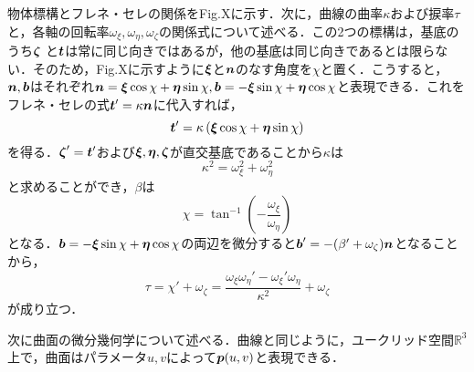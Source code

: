  	物体標構とフレネ・セレの関係をFig.Xに示す．次に，曲線の曲率$ \kappa $および捩率$ \tau $と，各軸の回転率$ \omega_{\xi},\omega_{\eta},\omega_{\zeta} $の関係式について述べる．この2つの標構は，基底のうち$ \boldsymbol{\zeta}$ と$\boldsymbol{t} $は常に同じ向きではあるが，他の基底は同じ向きであるとは限らない．そのため，Fig.Xに示すように$ \boldsymbol{\xi} $と$ \boldsymbol{n} $のなす角度を$ \chi $と置く．こうすると，$ \boldsymbol{n},\boldsymbol{b}$はそれぞれ$ \boldsymbol{n} = \boldsymbol{\xi} \cos \chi + \boldsymbol{\eta} \sin \chi,\boldsymbol{b} = -\boldsymbol{\xi} \sin \chi + \boldsymbol{\eta} \cos \chi $と表現できる．これをフレネ・セレの式$ \boldsymbol{t}' = \kappa \boldsymbol{n} $に代入すれば，
 	\begin{equation}\label{eq:t_dot_eq}
 		\boldsymbol{t}' = \kappa \left( \boldsymbol{\xi} \cos \chi + \boldsymbol{\eta} \sin \chi \right)
 	\end{equation}
 	を得る．$ \boldsymbol{\zeta}' = \boldsymbol{t}' $および$ \boldsymbol{\xi},\boldsymbol{\eta},\boldsymbol{\zeta} $が直交基底であることから$ \kappa $は
 	\begin{equation}\label{eq:kappa_and_omega}
 		\kappa^2 = \omega_{\xi}^2 + \omega_{\eta}^2
 	\end{equation}
 	と求めることができ，$ \beta $は
 	\begin{equation}\label{eq:beta_and_omega}
 		\chi = \tan^{-1} \left( -\frac{\omega_{\xi}}{\omega_{\eta}} \right)
 	\end{equation}
 	となる．$ \boldsymbol{b} = -\boldsymbol{\xi} \sin \chi + \boldsymbol{\eta} \cos \chi$の両辺を微分すると$ \boldsymbol{b}' = -(\beta' + \omega_{\zeta})\boldsymbol{n} $となることから，
 	\begin{equation}\label{eq:tau_and_omega}
 		\tau = \chi' + \omega_{\zeta} = \frac{\omega_{\xi} \omega_{\eta}' - \omega_{\xi}' \omega_{\eta}}{\kappa^2} + \omega_{\zeta} 
 	\end{equation}
 	が成り立つ．%
 	
 	次に曲面の微分幾何学について述べる．曲線と同じように，ユークリッド空間$ \mathbb{R}^3 $上で，曲面はパラメータ$ u,v $によって$ \boldsymbol{p}(u,v) $と表現できる．